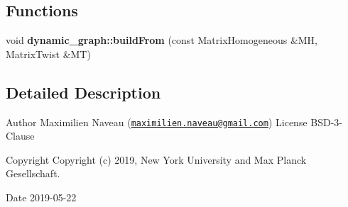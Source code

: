 \subsection*{Functions}
\begin{DoxyCompactItemize}
\item 
void {\bfseries dynamic\+\_\+graph\+::build\+From} (const Matrix\+Homogeneous \&MH, Matrix\+Twist \&MT)\hypertarget{namespacedynamic__graph_a8023711282c3d038a68202b12d5279d6}{}\label{namespacedynamic__graph_a8023711282c3d038a68202b12d5279d6}

\end{DoxyCompactItemize}


\subsection{Detailed Description}
\begin{DoxyAuthor}{Author}
Maximilien Naveau (\href{mailto:maximilien.naveau@gmail.com}{\tt maximilien.\+naveau@gmail.\+com})  License B\+S\+D-\/3-\/\+Clause 
\end{DoxyAuthor}
\begin{DoxyCopyright}{Copyright}
Copyright (c) 2019, New York University and Max Planck Gesellschaft. 
\end{DoxyCopyright}
\begin{DoxyDate}{Date}
2019-\/05-\/22 
\end{DoxyDate}
